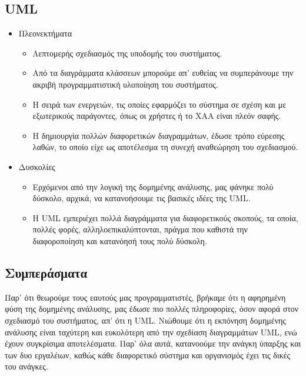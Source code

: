 \documentclass{article}
\begin{document}
\subsection{UML}
\begin{itemize}
	\item Πλεονεκτήματα
		\begin{itemize}
			\item Λεπτομερής σχεδιασμός της υποδομής του συστήματος.
			\item Από τα διαγράμματα κλάσσεων μπορούμε απ' ευθείας να συμπεράνουμε την ακριβή προγραμματιστική υλοποίηση του συστήματος.
			\item Η σειρά των ενεργειών, τις οποίες εφαρμόζει το σύστημα σε σχέση και με εξωτερικούς παράγοντες, όπως οι χρήστες ή το ΧΑΑ είναι πλεόν σαφής.
			\item Η δημιουργία πολλών διαφορετικών διαγραμμάτων, έδωσε τρόπο εύρεσης λαθών, το οποίο είχε ως αποτέλεσμα τη συνεχή αναθεώρηση του σχεδιασμού. 
		\end{itemize}
	\item Δυσκολίες
		\begin{itemize}
			\item Ερχόμενοι από την λογική της δομημένης ανάλυσης, μας φάνηκε πολύ δύσκολο, αρχικά, να κατανοήσουμε τις βασικές ιδέες της UML.
			\item H UML εμπεριέχει πολλά διαγράμματα για διαφορετικούς σκοπούς, τα οποία,
			 πολλές φορές, αλληλοεπικαλύπτονται, πράγμα που καθιστά την διαφοροποίηση και κατανόησή τους πολύ δύσκολη.
		\end{itemize}
\end{itemize}

\subsection{Συμπεράσματα}
Παρ' ότι θεωρούμε τους εαυτούς μας προγραμματιστές, βρήκαμε ότι η αφηρημένη φύση της δομημένης ανάλυσης, μας έδωσε πιο πολλές 
πληροφορίες, όσον αφορά στον σχεδιασμό του συστήματος, απ' ότι η UML. Νιώθουμε ότι η εκπόνηση δομημένης ανάλυσης είναι ταχύτερη και ευκολότερη 
από την σχεδίαση διαγραμμάτων UML, ενώ έχουν συγκρίσιμα αποτελέσματα. Παρ' όλα αυτά, κατανοούμε την ανάγκη ύπαρξης και των δυο εργαλέιων, 
καθώς κάθε διαφορετικό σύστημα και οργανισμός έχει τις δικές του ανάγκες.
\end{document}
